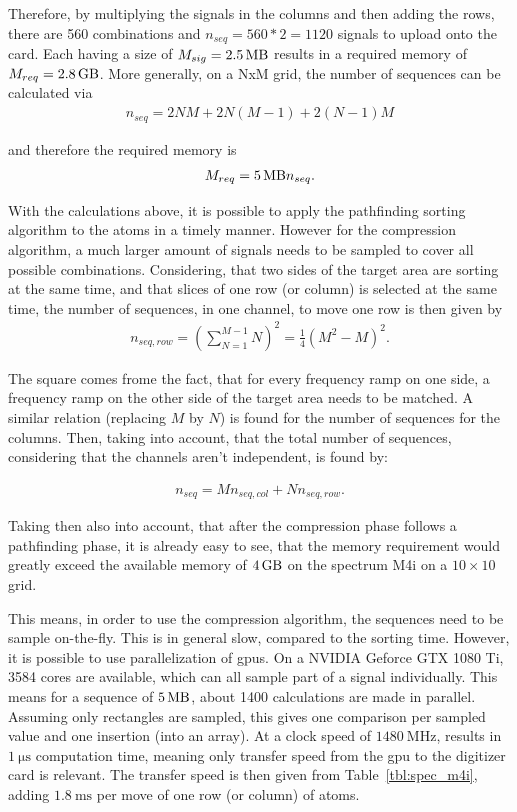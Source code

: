 Therefore, by multiplying the signals in the columns and then adding the rows, there are 560 combinations and $n_{seq} = 560*2=1120$ signals to upload onto the card. Each having a size of $M_{sig} = \SI{2.5}{\mega\byte}$ results in a required memory of $M_{req}=\SI{2.8}{\giga\byte}$. More generally, on a NxM grid, the number of sequences can be calculated via
\begin{align}
	n_{seq} = 2 N M + 2 N (M-1) + 2 (N-1) M
\end{align}

and therefore the required memory is
\begin{align}
	M_{req} = \SI{5}{\mega\byte} n_{seq}.
\end{align}

With the calculations above, it is possible to apply the pathfinding sorting algorithm to the atoms in a timely manner. However for the compression algorithm, a much larger amount of signals needs to be sampled to cover all possible combinations. Considering, that two sides of the target area are sorting at the same time, and that slices of one row (or column) is selected at the same time, the number of sequences, in one channel, to move one row is then given by
\begin{align}
	n_{seq,row} = {\left(\sum_{N=1}^{M-1} N\right)}^2 = \frac{1}{4} {(M^2-M)}^2.
\end{align}

The square comes frome the fact, that for every frequency ramp on one side, a frequency ramp on the other side of the target area needs to be matched. A similar relation (replacing $M$ by $N$) is found for the number of sequences for the columns. Then, taking into account, that the total number of sequences, considering that the channels aren't independent, is found by:

\begin{align}
	n_{seq} = M n_{seq,col} + N n_{seq,row}.
\end{align}

Taking then also into account, that after the compression phase follows a pathfinding phase, it is already easy to see, that the memory requirement would greatly exceed the available memory of $\SI{4}{\giga\byte}$ on the spectrum M4i on a $10\times10$ grid.

This means, in order to use the compression algorithm, the sequences need to be sample on-the-fly. This is in general slow, compared to the sorting time. However, it is possible to use parallelization of \acp{gpu}. On a NVIDIA Geforce GTX 1080 Ti, 3584 cores are available, which can all sample part of a signal individually. This means for a sequence of $\SI{5}{\mega\byte}$, about 1400 calculations are made in parallel. Assuming only rectangles are sampled, this gives one comparison per sampled value and one insertion (into an array). At a clock speed of $\SI{1480}{\mega\hertz}$,\cite{NVIDIA} results in $\SI{1}{\micro\second}$ computation time, meaning only transfer speed from the \ac{gpu} to the digitizer card is relevant. The transfer speed is then given from Table~\ref{tbl:spec_m4i}, adding $\SI{1.8}{\milli\second}$ per move of one row (or column) of atoms.

